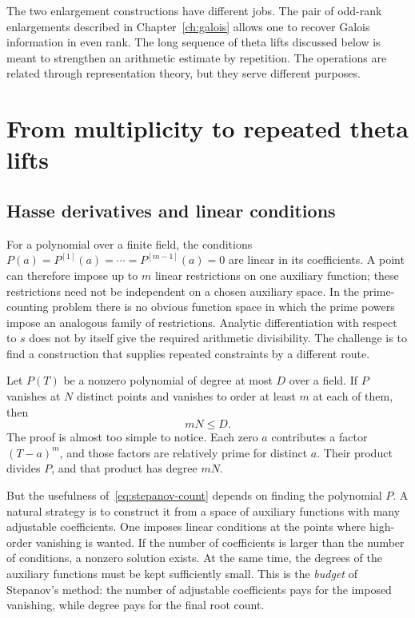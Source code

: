 \documentclass[11pt,openany,oneside]{scrbook}
\theoremstyle{definition}
\theoremstyle{remark}
\begin{document}
The two enlargement constructions have different jobs. The pair of odd-rank enlargements described in Chapter~\ref{ch:galois} allows one to recover Galois information in even rank. The long sequence of theta lifts discussed below is meant to strengthen an arithmetic estimate by repetition. The operations are related through representation theory, but they serve different purposes.

\chapter{From multiplicity to repeated theta lifts}\label{ch:stepanov}

\section{Hasse derivatives and linear conditions}

For a polynomial over a finite field, the conditions $P(a)=P^{[1]}(a)=\cdots=P^{[m-1]}(a)=0$ are linear in its coefficients. A point can therefore impose up to $m$ linear restrictions on one auxiliary function; these restrictions need not be independent on a chosen auxiliary space. In the prime-counting problem there is no obvious function space in which the prime powers impose an analogous family of restrictions. Analytic differentiation with respect to $s$ does not by itself give the required arithmetic divisibility. The challenge is to find a construction that supplies repeated constraints by a different route.

Let $P(T)$ be a nonzero polynomial of degree at most $D$ over a field. If $P$ vanishes at $N$ distinct points and vanishes to order at least $m$ at each of them, then
\begin{equation}\label{eq:stepanov-count}
 mN\le D.
\end{equation}
The proof is almost too simple to notice. Each zero $a$ contributes a factor $(T-a)^m$, and those factors are relatively prime for distinct $a$. Their product divides $P$, and that product has degree $mN$.

But the usefulness of~\eqref{eq:stepanov-count} depends on finding the polynomial $P$. A natural strategy is to construct it from a space of auxiliary functions with many adjustable coefficients. One imposes linear conditions at the points where high-order vanishing is wanted. If the number of coefficients is larger than the number of conditions, a nonzero solution exists. At the same time, the degrees of the auxiliary functions must be kept sufficiently small. This is the \emph{budget} of Stepanov's method: the number of adjustable coefficients pays for the imposed vanishing, while degree pays for the final root count.
\end{document}
